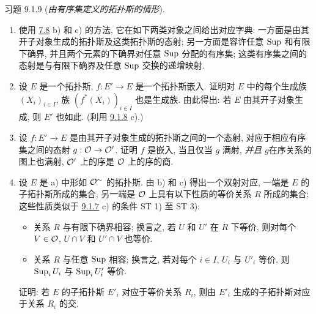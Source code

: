 \begin{enonce*}[remark]{习题 9.1.9}
(\emph{由有序集定义的拓扑斯的情形}).

\begin{enumerate}
\renewcommand{\theenumi}{\alph{enumi}}
\renewcommand{\labelenumi}{\theenumi)}
\item 使用 \hyperref[IV.exer7.8]{7.8} b) 和 c) 的方法,
它在如下两类对象之间给出对应字典:
一方面是由其开子对象生成的拓扑斯及这类拓扑斯的态射;
另一方面是容许任意 $\operatorname{Sup}$ 和有限下确界,
并且两个元素的下确界对任意 $\operatorname{Sup}$ 分配的有序集;
这类有序集之间的态射是与有限下确界及任意 $\operatorname{Sup}$ 交换的递增映射.

\item 设 $E$ 是一个拓扑斯, $f:E'\rightarrow E$ 是一个拓扑斯嵌入.
证明对 $E$ 中的每个生成族 $(X_i)_{i\in I}$,
族 $(f^{\ast}(X_i))_{i \in I}$ 也是生成族.
由此得出: 若 $E$ 由其开子对象生成, 则 $E'$ 也如此.
(利用 \hyperref[IV.exer9.1.8]{9.1.8} c).)

\item 设 $f:E'\rightarrow E$ 是由其开子对象生成的拓扑斯之间的一个态射,
对应于相应有序集之间的态射 $g:{\mathcal O}\rightarrow{\mathcal O}'$.
证明 $f$ 是嵌入, 当且仅当 $g$ 满射,
\emph{并且} $g$\pageoriginale 在序关系的图上也满射,
\ie ${\mathcal O}'$ 上的序是 ${\mathcal O}$ 上的序的商.

\item 设 $E$ 是 a) 中形如 ${\mathcal O}^{\sim}$ 的拓扑斯.
由 b) 和 c) 得出一个双射对应,
一端是 $E$ 的子拓扑斯所成的集合,
另一端是 ${\mathcal O}$ 上具有以下性质的等价关系 $R$ 所成的集合;
这些性质类似于 \hyperref[IV.exer9.1.7]{9.1.7} c) 的条件 ST 1) 至 ST 3):
\begin{itemize}
\item[Q0 1)] 关系 $R$ 与有限下确界相容;
换言之, 若 $U$ 和 $U'$ 在 $R$ 下等价,
则对每个 $V\in{\mathcal O}$, $U\cap V$ 和 $U'\cap V$ 也等价.

\item[Q0 2)] 关系 $R$ 与任意 $\operatorname{Sup}$ 相容;
换言之, 若对每个 $i\in I$, $U_i$ 与 $U'_i$ 等价,
则 $\operatorname{Sup}_i U_i$ 与 $\operatorname{Sup}_i U'_i$ 等价.
\end{itemize}

证明: 若 $E$ 的子拓扑斯 $E'_i$ 对应于等价关系 $R_i$,
则由 $E'_i$ 生成的子拓扑斯对应于关系 $R_i$ 的交.
\end{enumerate}
\end{enonce*}

